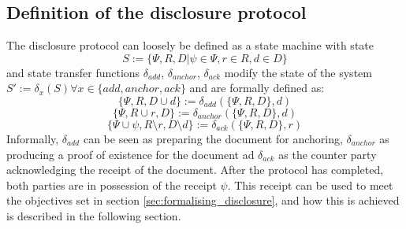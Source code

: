 \documentclass[12pt,msc,a4paper,oneside]{ucl_thesis}
\begin{document}
\subsection{Definition of the disclosure protocol}
The disclosure protocol can loosely be defined as a state machine with state 
\begin{equation}
    S := \{\Psi, R, D | \psi \in \Psi, r \in R, d \in D\}
    \label{eq:disclosure_state_machine}
\end{equation}
and state transfer functions $\delta_{add}$, $\delta_{anchor}$, $\delta_{ack}$ modify the state of the system $S' := \delta_x(S) \forall x \in \{add, anchor, ack\}$ and are formally defined as:
\begin{equation}
    \{\Psi, R, D \cup d\} := \delta_{add}(\{\Psi, R, D\}, d)
    \label{eq:disclosure_delta_add}
\end{equation}
\begin{equation}
    \{\Psi, R \cup r, D\} := \delta_{anchor}(\{\Psi, R, D\}, d)
    \label{eq:disclosure_delta_anchor}
\end{equation}
\begin{equation}
    \{\Psi \cup \psi, R \setminus r, D \setminus d\} := \delta_{ack}(\{\Psi, R, D\}, r)
    \label{eq:disclosure_delta_ack}
\end{equation}
Informally, $\delta_{add}$ can be seen as preparing the document for anchoring, $\delta_{anchor}$ as producing a proof of existence for the document ad $\delta_{ack}$ as the counter party acknowledging the receipt of the document. After the protocol has completed, both parties are in possession of the receipt $\psi$. This receipt can be used to meet the objectives set in section \ref{sec:formalising_disclosure}, and how this is achieved is described in the following section.
\end{document}
